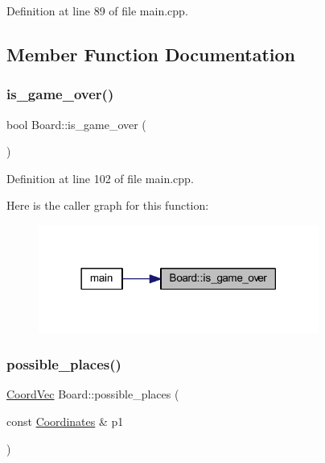 Definition at line 89 of file main.\+cpp.



\subsection{Member Function Documentation}
\mbox{\label{class_board_a386f2e5861a55976ec6a4e94d4cae38b}} 
\subsubsection{\texorpdfstring{is\_game\_over()}{is\_game\_over()}}
{\footnotesize\ttfamily bool Board\+::is\+\_\+game\+\_\+over (\begin{DoxyParamCaption}{ }\end{DoxyParamCaption})\hspace{0.3cm}{\ttfamily [inline]}}



Definition at line 102 of file main.\+cpp.

Here is the caller graph for this function\+:
\nopagebreak
\begin{figure}[H]
\begin{center}
\leavevmode
\includegraphics[width=261pt]{class_board_a386f2e5861a55976ec6a4e94d4cae38b_icgraph}
\end{center}
\end{figure}
\mbox{\label{class_board_a50777989564d829d24dcd8aa63816dcb}} 
\subsubsection{\texorpdfstring{possible\_places()}{possible\_places()}}
{\footnotesize\ttfamily \mbox{\hyperlink{main_8cpp_a267937870648899c879128d3199195ec}{Coord\+Vec}} Board\+::possible\+\_\+places (\begin{DoxyParamCaption}\item[{const \mbox{\hyperlink{class_coordinates}{Coordinates}} \&}]{p1 }\end{DoxyParamCaption})\hspace{0.3cm}{\ttfamily [inline]}}



